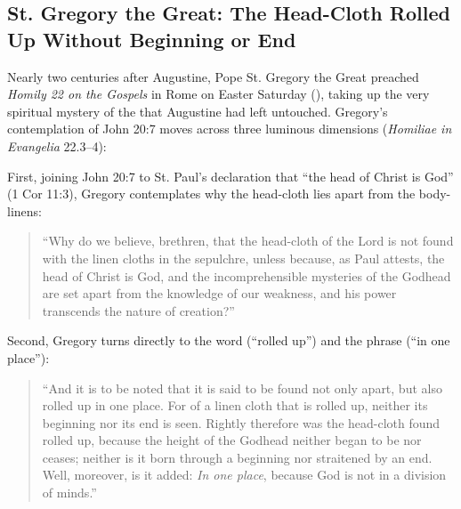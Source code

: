 \subsection{St. Gregory the Great: The Head-Cloth Rolled Up Without Beginning or End}

Nearly two centuries after Augustine, Pope St. Gregory the Great preached \emph{Homily 22 on the Gospels} in Rome on Easter Saturday (), taking up the very spiritual mystery of the  that Augustine had left untouched. Gregory's contemplation of John 20:7 moves across three luminous dimensions (\emph{Homiliae in Evangelia} 22.3--4):

First, joining John 20:7 to St. Paul's declaration that ``the head of Christ is God'' (1 Cor 11:3), Gregory contemplates why the head-cloth lies apart from the body-linens:
\begin{quote}
``Why do we believe, brethren, that the head-cloth of the Lord is not found with the linen cloths in the sepulchre, unless because, as Paul attests, the head of Christ is God, and the incomprehensible mysteries of the Godhead are set apart from the knowledge of our weakness, and his power transcends the nature of creation?''
\end{quote}

Second, Gregory turns directly to the word  (``rolled up'') and the phrase  (``in one place''):
\begin{quote}
``And it is to be noted that it is said to be found not only apart, but also rolled up in one place. For of a linen cloth that is rolled up, neither its beginning nor its end is seen. Rightly therefore was the head-cloth found rolled up, because the height of the Godhead neither began to be nor ceases; neither is it born through a beginning nor straitened by an end. Well, moreover, is it added: \emph{In one place}, because God is not in a division of minds.''
\end{quote}

